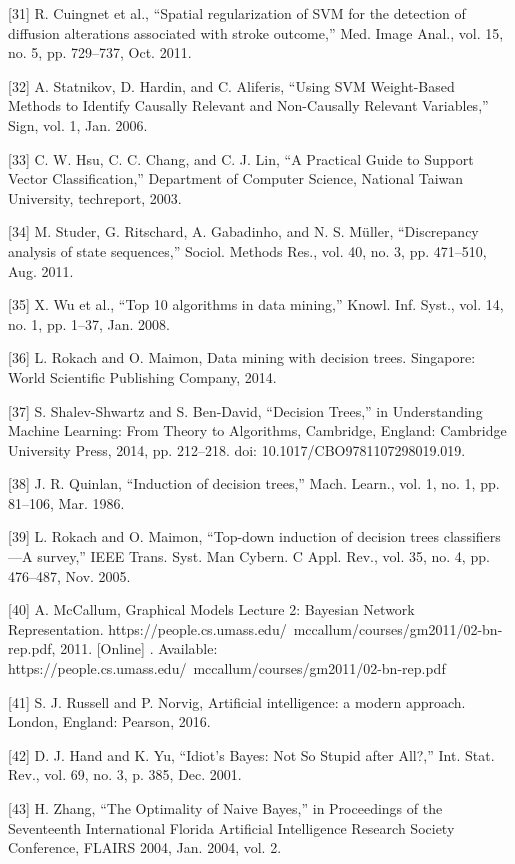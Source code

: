 \documentclass[sn-mathphys-num]{sn-jnl}%
\begin{document}
[31] R. Cuingnet et al., “Spatial regularization of SVM for the detection of diffusion alterations associated with stroke outcome,” Med. Image Anal., vol. 15, no. 5, pp. 729–737, Oct. 2011.

[32] A. Statnikov, D. Hardin, and C. Aliferis, “Using SVM Weight-Based Methods to Identify Causally Relevant and Non-Causally Relevant Variables,” Sign, vol. 1, Jan. 2006.

[33] C. W. Hsu, C. C. Chang, and C. J. Lin, “A Practical Guide to Support Vector Classification,” Department of Computer Science, National Taiwan University, techreport, 2003.

[34] M. Studer, G. Ritschard, A. Gabadinho, and N. S. Müller, “Discrepancy analysis of state sequences,” Sociol. Methods Res., vol. 40, no. 3, pp. 471–510, Aug. 2011.

[35] X. Wu et al., “Top 10 algorithms in data mining,” Knowl. Inf. Syst., vol. 14, no. 1, pp. 1–37, Jan. 2008.

[36] L. Rokach and O. Maimon, Data mining with decision trees. Singapore: World Scientific Publishing Company, 2014.

[37] S. Shalev-Shwartz and S. Ben-David, “Decision Trees,” in Understanding Machine Learning: From Theory to Algorithms, Cambridge, England: Cambridge University Press, 2014, pp. 212–218. doi: 10.1017/CBO9781107298019.019.

[38] J. R. Quinlan, “Induction of decision trees,” Mach. Learn., vol. 1, no. 1, pp. 81–106, Mar. 1986.

[39] L. Rokach and O. Maimon, “Top-down induction of decision trees classifiers—A survey,” IEEE Trans. Syst. Man Cybern. C Appl. Rev., vol. 35, no. 4, pp. 476–487, Nov. 2005.

[40] A. McCallum, Graphical Models Lecture 2: Bayesian Network Representation. https://people.cs.umass.edu/ mccallum/courses/gm2011/02-bn-rep.pdf, 2011. [Online] . Available: https://people.cs.umass.edu/ mccallum/courses/gm2011/02-bn-rep.pdf

[41] S. J. Russell and P. Norvig, Artificial intelligence: a modern approach. London, England: Pearson, 2016.

[42] D. J. Hand and K. Yu, “Idiot’s Bayes: Not So Stupid after All?,” Int. Stat. Rev., vol. 69, no. 3, p. 385, Dec. 2001.

[43] H. Zhang, “The Optimality of Naive Bayes,” in Proceedings of the Seventeenth International Florida Artificial Intelligence Research Society Conference, FLAIRS 2004, Jan. 2004, vol. 2.
\end{document}
